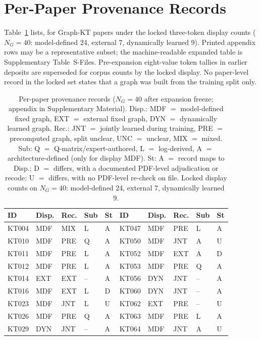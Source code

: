 \documentclass[lettersize,journal]{IEEEtran}
\begin{document}
\section{Per-Paper Provenance Records}
\label{app:provenance}
Table~\ref{tab:prov_appendix} lists, for Graph-KT papers under the locked three-token display counts ($N_G=40$: model-defined 24, external 7, dynamically learned 9). Printed appendix rows may be a representative subset; the machine-readable expanded table is Supplementary Table~S-Files. Pre-expansion eight-value token tallies in earlier deposits are superseded for corpus counts by the locked display. No paper-level record in the locked set states that a graph was built from the training split only.
\begin{table}[t]
\caption{Per-paper provenance records ($N_G=40$ after expansion freeze; appendix in Supplementary Material). Disp.: MDF $=$ model-defined fixed graph, EXT $=$ external fixed graph, DYN $=$ dynamically learned graph. Rec.: JNT $=$ jointly learned during training, PRE $=$ precomputed graph, split unclear, UNC $=$ unclear, MIX $=$ mixed. Sub: Q $=$ Q-matrix/expert-authored, L $=$ log-derived, A $=$ architecture-defined (only for display MDF). St: A $=$ record maps to Disp.; D $=$ differs, with a documented PDF-level adjudication or recode; U $=$ differs, with no PDF-level re-check on file. Locked display counts on $N_G=40$: model-defined 24, external 7, dynamically learned 9.}
\label{tab:prov_appendix}
\centering
\scriptsize
\setlength{\tabcolsep}{3.5pt}
\begin{tabular}{@{}lllll@{\hspace{1.4em}}lllll@{}}
\toprule
ID & Disp. & Rec. & Sub & St & ID & Disp. & Rec. & Sub & St \\
\midrule
KT004 & MDF & MIX & L & A & KT047 & MDF & PRE & L & A \\
KT010 & MDF & PRE & Q & A & KT050 & MDF & JNT & A & U \\
KT011 & MDF & PRE & L & A & KT052 & MDF & EXT & A & D \\
KT012 & MDF & PRE & L & A & KT053 & MDF & PRE & Q & A \\
KT014 & EXT & EXT & -- & A & KT056 & DYN & JNT & -- & A \\
KT016 & MDF & EXT & L & D & KT060 & DYN & JNT & -- & A \\
KT023 & MDF & JNT & L & U & KT062 & EXT & PRE & -- & U \\
KT026 & MDF & PRE & Q & A & KT063 & MDF & PRE & L & A \\
KT029 & DYN & JNT & -- & A & KT064 & MDF & JNT & A & U \\

\end{tabular}
\end{table}
\end{document}
